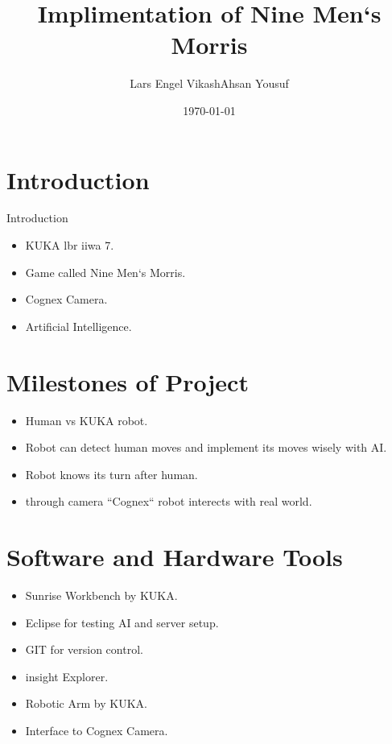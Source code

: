 \documentclass{beamer}
\title{Implimentation of Nine Men`s Morris}
\author{Lars Engel \newline Vikash\newline Ahsan Yousuf}
\institute{Fachhochschule Kiel}
\date{\today}
\begin{document}

\begin{frame}
\titlepage
\end{frame}


\section{Introduction}
\begin{frame}{Introduction }
\begin{itemize}
\item KUKA lbr iiwa 7.
\item Game called Nine Men`s Morris.
\item Cognex Camera.
\item Artificial Intelligence.
\end{itemize}
\end{frame}

\section{Milestones of Project}
\begin{frame}
\begin{itemize}
\item Human vs KUKA robot.  
\item Robot can detect human moves and implement its moves wisely with AI.
\item Robot knows its turn after human.
\item through camera ``Cognex`` robot interects with real world.
\end{itemize}
\end{frame}

\section{Software and Hardware Tools}
\begin{frame}
\begin{itemize}
\item Sunrise Workbench by KUKA.
\item Eclipse for testing AI and server setup.
\item GIT for version control.
\item insight Explorer.
\item Robotic Arm by KUKA.
\item Interface to Cognex Camera.
\end{itemize}
\end{frame}
\end{document}

